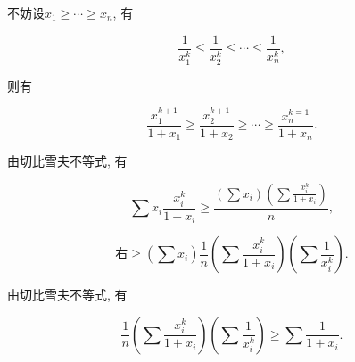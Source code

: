 \documentclass[8pt]{article}
\begin{document}
\begin{enumerate}
			不妨设$x_1 \geq \cdots \geq x_n$, 有

			$$\frac{1}{x_1^k}\leq \frac{1}{x_2^k} \leq \cdots\leq\frac{1}{x_n^k},$$

			则有

			$$\frac{x_1^{k+1}}{1+x_1} \geq \frac{x_2^{k+1}}{1+x_2} \geq \cdots \geq \frac{x_n^{k=1}}{1+x_n}.$$

			由切比雪夫不等式, 有

			$$\sum x_i \frac{x_i^k}{1+x_i} \geq \frac{\left(\sum x_i\right)\left(\sum\frac{x_i^k}{1+x_i}\right)}{n},$$

			$$\text{右} \geq \left(\sum x_i\right)\frac{1}{n}\left(\sum \frac{x_i^k}{1+x_i}\right)\left(\sum \frac{1}{x_i^k}\right).$$

			由切比雪夫不等式, 有

			$$\frac{1}{n}\left(\sum \frac{x_i^k}{1+x_i}\right)\left(\sum \frac{1}{x_i^k}\right) \geq \sum\frac{1}{1+x_i}.$$

	\end{enumerate}
\end{document}
